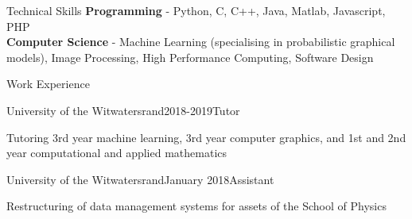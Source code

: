 \documentclass{resume} %
\begin{document}
\begin{rSection}{Technical Skills}
\textbf{Programming} - Python, C, C++, Java, Matlab, Javascript, PHP
\\
\textbf{Computer Science} - Machine Learning (specialising in probabilistic graphical models), Image Processing, High Performance Computing, Software Design
\end{rSection}


\begin{rSection}{Work Experience}
\begin{rSubsection}{University of the Witwatersrand}{2018-2019}{Tutor}{}
\item Tutoring 3rd year machine learning, 3rd year computer graphics, and 1st and 2nd year computational and applied mathematics
\end{rSubsection}
\begin{rSubsection}{University of the Witwatersrand}{January 2018}{Assistant}{}
\item Restructuring of data management systems for assets of the School of Physics
\end{rSubsection}


\end{rSection}
\end{document}
